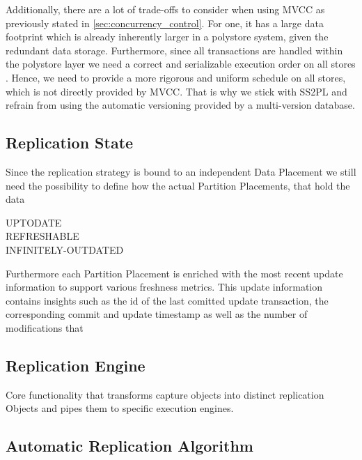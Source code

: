 Additionally, there are a lot of trade-offs to consider when using MVCC as previously stated in \ref{sec:concurrency_control}.
For one, it has a large data footprint which is already inherently larger in a polystore system, given the redundant data storage.
Furthermore, since all transactions are handled within the polystore layer we need a correct and serializable execution order on all stores . 
Hence, we need to provide a more rigorous and uniform schedule on all stores, which is not directly provided by MVCC.
That is why we stick with SS2PL and refrain from using the automatic versioning provided by a multi-version database.\\



\subsection{Replication State}

Since the replication strategy is bound to an independent Data Placement we still need the possibility to define how the actual Partition Placements, that hold the data 


\begin{description}
    \item [UPTODATE]
    \item [REFRESHABLE]
    \item [INFINITELY-OUTDATED]
\end{description}

Furthermore each Partition Placement is enriched with the most recent update information to support various freshness metrics.
This update information contains insights such as the id of the last comitted update transaction, the corresponding commit and update timestamp as well as the number of 
modifications that 


\subsection{Replication Engine}
Core functionality that transforms capture objects into distinct replication Objects and pipes them to specific execution engines.


\subsection{Automatic Replication Algorithm}


